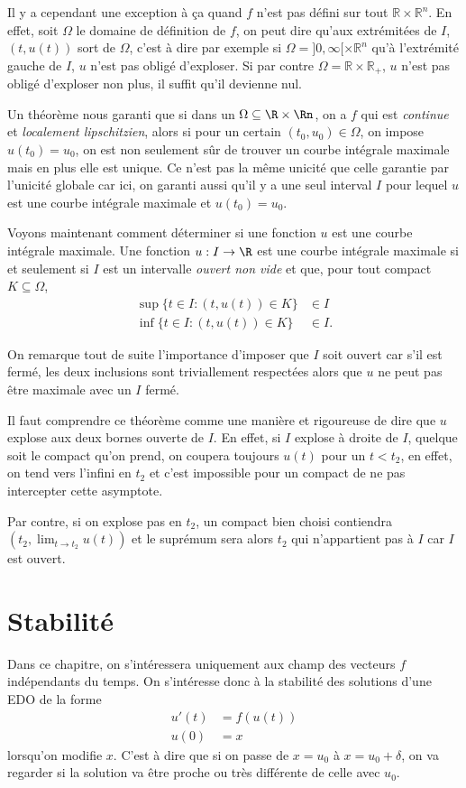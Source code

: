 Il y a cependant une exception à ça quand $f$ n'est pas défini sur tout
$\mathbb{R}\times\mathbb{R}^n$.
En effet, soit $\Omega$ le domaine de définition de $f$, on peut dire
qu'aux extrémitées de $I$, $(t,u(t))$ sort de $\Omega$, c'est à dire par
exemple si $\Omega = ]0,\infty[ \times \mathbb{R}^n$ qu'à l'extrémité
gauche de $I$, $u$ n'est pas obligé d'exploser.
Si par contre $\Omega = \mathbb{R} \times \mathbb{R}_+$,
$u$ n'est pas obligé d'exploser non plus, il suffit qu'il devienne nul.

Un théorème nous garanti que si dans
un $\Omega \subseteq \R\times\Rn$, on a $f$ qui est \emph{continue}
et \emph{localement lipschitzien},
alors si pour un certain $(t_0, u_0) \in \Omega$, on impose
$u(t_0) = u_0$, on est non seulement sûr de trouver un courbe intégrale
maximale mais en plus elle est unique.
Ce n'est pas la même unicité que celle garantie par l'unicité globale car
ici, on garanti aussi qu'il y a une seul interval $I$ pour lequel $u$
est une courbe intégrale maximale et $u(t_0) = u_0$.

Voyons maintenant comment déterminer si une fonction $u$ est une
courbe intégrale maximale.
Une fonction $u:I\to\R$ est une courbe intégrale maximale
si et seulement si
$I$ est un intervalle \emph{ouvert non vide} et que,
pour tout compact $K \subseteq \Omega$,
\begin{align*}
  \sup\{t \in I: (t, u(t)) \in K\} & \in I\\
  \inf\{t \in I: (t, u(t)) \in K\} & \in I.
\end{align*}

On remarque tout de suite l'importance d'imposer que $I$ soit ouvert
car s'il est fermé, les deux inclusions sont triviallement respectées
alors que $u$ ne peut pas être maximale avec un $I$ fermé.

Il faut comprendre ce théorème comme une manière et rigoureuse de dire que
$u$ explose aux deux bornes ouverte de $I$.
En effet, si $I$ explose à droite de $I$,
quelque soit le compact qu'on prend, on coupera toujours $u(t)$ pour un
$t < t_2$, en effet, on tend vers l'infini en $t_2$ et c'est impossible
pour un compact de ne pas intercepter cette asymptote.

Par contre, si on explose pas en $t_2$, un compact bien choisi
contiendra $(t_2, \lim_{t \to t_2} u(t))$ et le suprémum sera alors $t_2$
qui n'appartient pas à $I$ car $I$ est ouvert.

\section{Stabilité}
Dans ce chapitre, on s'intéressera uniquement aux
champ des vecteurs $f$ indépendants du temps.
On s'intéresse donc à la stabilité des solutions d'une EDO de la forme
\begin{align*}
  u'(t) & = f(u(t))\\
  u(0) & = x
\end{align*}
lorsqu'on modifie $x$.
C'est à dire que si on passe de $x = u_0$ à $x = u_0 + \delta$,
on va regarder si
la solution va être proche ou très différente de celle avec $u_0$.

